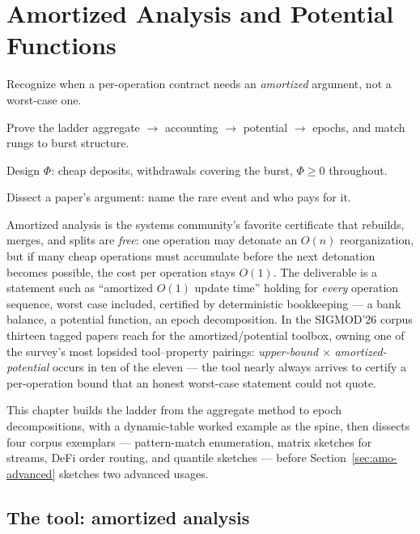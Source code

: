 \chapter{Amortized Analysis and Potential Functions}
\setcounter{section}{-1}   %
\label{ch:amo}

\begin{objectives}
\item Recognize when a per-operation contract needs an \emph{amortized}
  argument, not a worst-case one.
\item Prove the ladder aggregate $\to$ accounting $\to$ potential $\to$ epochs,
  and match rungs to burst structure.
\item Design $\Phi$: cheap deposits, withdrawals covering the burst,
  $\Phi \ge 0$ throughout.
\item Dissect a paper's argument: name the rare event and who pays for it.
\end{objectives}

Amortized analysis is the systems community's favorite certificate that
rebuilds, merges, and splits are \emph{free}: one operation may detonate an
$O(n)$ reorganization, but if many cheap operations must accumulate before
the next detonation becomes possible, the cost per operation stays $O(1)$.
The deliverable is a statement such as ``amortized $O(1)$ update time''
holding for \emph{every} operation sequence, worst case included, certified
by deterministic bookkeeping --- a bank balance, a potential function, an
epoch decomposition. In the SIGMOD'26 corpus thirteen tagged papers reach for
the amortized/potential toolbox, owning one of the survey's most lopsided
tool--property pairings: \emph{upper-bound} $\times$
\emph{amortized-potential} occurs in ten of the eleven --- the tool nearly
always arrives to certify a per-operation bound that an honest worst-case
statement could not quote.

This chapter builds the ladder from the aggregate method to epoch
decompositions, with a dynamic-table worked example as the spine, then
dissects four corpus exemplars --- pattern-match enumeration, matrix
sketches for streams, DeFi order routing, and quantile sketches --- before
Section~\ref{sec:amo-advanced} sketches two advanced usages.

\section{The tool: amortized analysis}
\label{sec:amo-tool}

